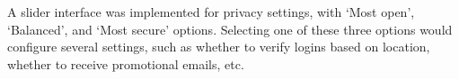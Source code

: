 \documentclass{article}
\begin{document}
\begin{figure}[h]
\end{figure}

A slider interface was implemented for privacy settings, with `Most open', `Balanced', and `Most secure' options. Selecting one of these three options would configure several settings, such as whether to verify logins based on location, whether to receive promotional emails, etc.
\end{document}
